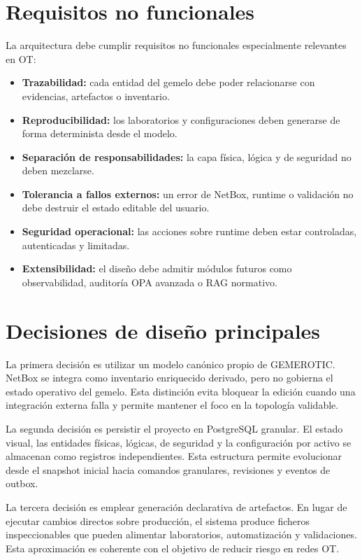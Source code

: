 \section{Requisitos no funcionales} \label{sec:requisitos-no-funcionales}

La arquitectura debe cumplir requisitos no funcionales especialmente relevantes en OT:

\begin{itemize}
    \item \textbf{Trazabilidad:} cada entidad del gemelo debe poder relacionarse con evidencias, artefactos o inventario.
    \item \textbf{Reproducibilidad:} los laboratorios y configuraciones deben generarse de forma determinista desde el modelo.
    \item \textbf{Separación de responsabilidades:} la capa física, lógica y de seguridad no deben mezclarse.
    \item \textbf{Tolerancia a fallos externos:} un error de NetBox, runtime o validación no debe destruir el estado editable del usuario.
    \item \textbf{Seguridad operacional:} las acciones sobre runtime deben estar controladas, autenticadas y limitadas.
    \item \textbf{Extensibilidad:} el diseño debe admitir módulos futuros como observabilidad, auditoría OPA avanzada o RAG normativo.
\end{itemize}

\section{Decisiones de diseño principales} \label{sec:decisiones-diseno}

La primera decisión es utilizar un modelo canónico propio de GEMEROTIC. NetBox se integra como inventario enriquecido derivado, pero no gobierna el estado operativo del gemelo. Esta distinción evita bloquear la edición cuando una integración externa falla y permite mantener el foco en la topología validable.

La segunda decisión es persistir el proyecto en PostgreSQL granular. El estado visual, las entidades físicas, lógicas, de seguridad y la configuración por activo se almacenan como registros independientes. Esta estructura permite evolucionar desde el snapshot inicial hacia comandos granulares, revisiones y eventos de outbox.

La tercera decisión es emplear generación declarativa de artefactos. En lugar de ejecutar cambios directos sobre producción, el sistema produce ficheros inspeccionables que pueden alimentar laboratorios, automatización y validaciones. Esta aproximación es coherente con el objetivo de reducir riesgo en redes OT.

